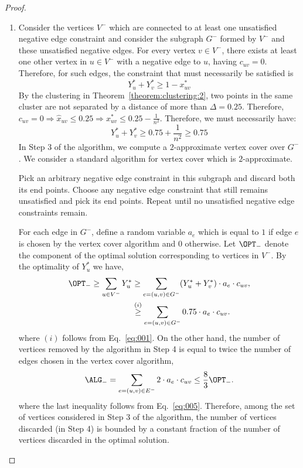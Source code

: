 \begin{proof}
\begin{enumerate}
	\item Consider the vertices $V^-$ which are connected to at least one unsatisfied negative edge constraint and consider the subgraph $G^-$ formed by $V^-$ and these unsatisfied negative edges. For every vertex $v \in V^-$, there exists at least one other vertex in $u \in V^-$ with a negative edge to $u$, having $c_{uv} = 0$. Therefore, for such edges, the constraint that must necessarily be satisfied is
	\begin{equation*}
        Y_u^* + Y_v^* \ge 1 - x^*_{uv}
	\end{equation*}
	By the clustering in Theorem~\ref{theorem:clustering:2}, two points in the same cluster are not separated by a distance of more than $\Delta = 0.25$. Therefore, $c_{uv} = 0 \Rightarrow \hat{x}_{uv} \le 0.25 \Rightarrow x_{uv}^* \le 0.25 - \frac{1}{n^2}$. Therefore, we must necessarily have:
	\begin{equation} \label{eq:001}
		Y_u^* + Y_v^* \ge 0.75 + \frac{1}{n^2} \ge 0.75
	\end{equation}
	In Step 3 of the algorithm, we compute a $2$-approximate vertex cover over $G^-$. We consider a standard algorithm for vertex cover which is $2$-approximate.
	\begin{algorithm} Pick an arbitrary negative edge constraint in this subgraph and discard both its end points. Choose any negative edge constraint that still remains unsatisfied and pick its end points. Repeat until no unsatisfied negative edge constraints remain.
	\end{algorithm}
	For each edge in $G^-$, define a random variable $a_e$ which is equal to $1$ if edge $e$ is chosen by the vertex cover algorithm and $0$ otherwise. Let $\OPT_-$ denote the component of the optimal solution corresponding to vertices in $V^-$. By the optimality of $Y^*_u$ we have,
	\begin{align}
	\OPT_- \ge \sum_{u \in V^-} Y^*_u &\ge \sum_{e = (u,v) \in G^-} (Y_{u}^* + Y_{v}^*) \cdot a_{e} \cdot c_{uv}, \nonumber\\
	&\overset{(i)}{\ge} \sum_{e = (u,v) \in G^-} 0.75 \cdot a_{e} \cdot c_{uv}. \label{eq:005}
	\end{align}
	where $(i)$ follows from Eq.~\eqref{eq:001}. On the other hand, the number of vertices removed by the algorithm in Step 4 is equal to twice the number of edges chosen in the vertex cover algorithm,
	\begin{equation*}
	\ALG_- = \sum_{e = (u,v) \in E^-} 2 \cdot a_{e} \cdot c_{uv} \le \frac83 \OPT_-.
	\end{equation*}
	where the last inequality follows from Eq.~\eqref{eq:005}. Therefore, among the set of vertices considered in Step 3 of the algorithm, the number of vertices discarded (in Step 4) is bounded by a constant fraction of the number of vertices discarded in the optimal solution.


\end{enumerate}
\end{proof}
